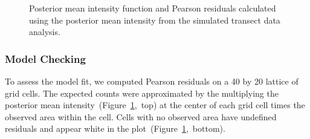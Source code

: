 \documentclass{interact}
\begin{document}
\begin{figure}[t!]\centering



\caption{Posterior mean intensity function and Pearson residuals calculated
using the posterior mean intensity from the simulated transect data analysis.}
\label{effortintensity}
\end{figure}


\subsubsection{Model Checking}
\label{effortresid}

To assess the model fit, we computed Pearson residuals on a 40 by 20 lattice of
grid cells. The expected counts were approximated by the multiplying the
posterior mean intensity~(Figure~\ref{effortintensity},~top) at the center of
each grid cell times the observed area within the cell. Cells with no observed
area have undefined residuals and appear white in the
plot~(Figure~\ref{effortintensity},~bottom).
\end{document}
